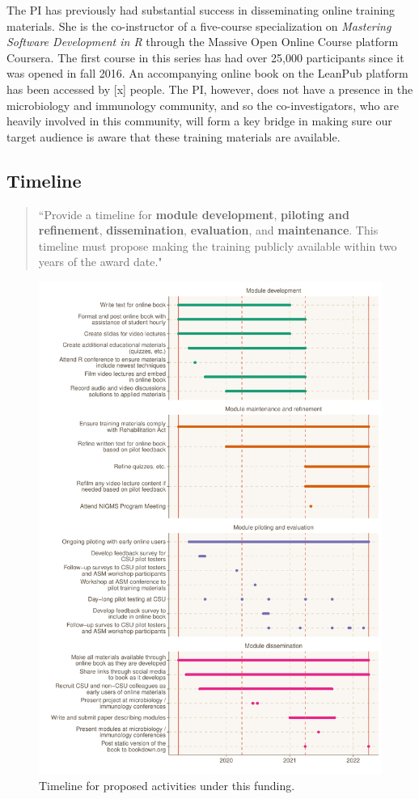 \documentclass[pdftex,english,11pt,parskip=half]{scrartcl}
\begin{document}
The PI has previously had substantial success in disseminating online training materials. She is the co-instructor of a five-course specialization on \textit{Mastering Software Development in R} through the Massive Open Online Course platform Coursera. The first course in this series has had over 25,000 participants since it was opened in fall 2016. An accompanying online book on the LeanPub platform has been accessed by [x] people. The PI, however, does not have a presence in the microbiology and immunology community, and so the co-investigators, who are heavily involved in this community, will form a key bridge in making sure our target audience is aware that these training materials are available.

\subsection{Timeline}

\begin{quotation}
``Provide a timeline for \textbf{module development}, \textbf{piloting and refinement}, \textbf{dissemination}, \textbf{evaluation}, and \textbf{maintenance}.  This timeline must propose making the training publicly available within two years of the award date."
\end{quotation}


\begin{figure}[ht]
    \includegraphics[width=\textwidth]{figures/timeline.pdf}
    \caption{Timeline for proposed activities under this funding.}
    \label{fig:timeline}
\end{figure}



\clearpage



\end{document}
